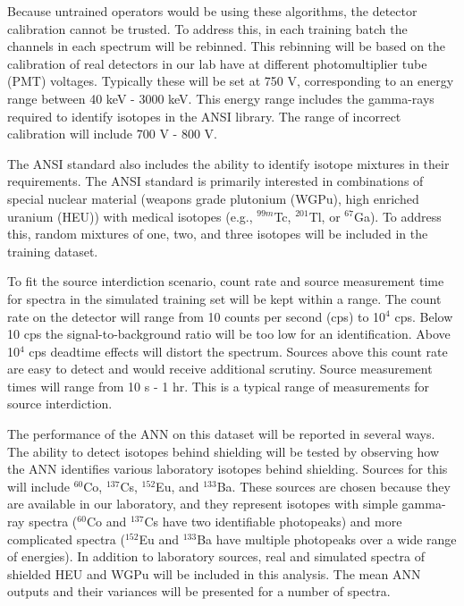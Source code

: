 \documentclass[tocnosub,noragright,centerchapter,12pt,fullpage]{uiucecethesis09}
\begin{document}

Because untrained operators would be using these algorithms, the detector calibration cannot be trusted. To address this, in each training batch the channels in each spectrum will be rebinned. This rebinning will be based on the calibration of real detectors in our lab have at different photomultiplier tube (PMT) voltages. Typically these will be set at 750 V, corresponding to an energy range between 40 keV - 3000 keV. This energy range includes the gamma-rays required to identify isotopes in the ANSI library. The range of incorrect calibration will include 700 V - 800 V.

The ANSI standard also includes the ability to identify isotope mixtures in their requirements. The ANSI standard is primarily interested in combinations of special nuclear material (weapons grade plutonium (WGPu), high enriched uranium (HEU)) with medical isotopes (e.g., $^{99m}$Tc, $^{201}$Tl, or $^{67}$Ga). To address this, random mixtures of one, two, and three isotopes will be included in the training dataset.

To fit the source interdiction scenario, count rate and source measurement time for spectra in the simulated training set will be kept within a range. The count rate on the detector will range from 10 counts per second (cps) to 10$^{4}$ cps. Below 10 cps the signal-to-background ratio will be too low for an identification. Above 10$^{4}$ cps deadtime effects will distort the spectrum. Sources above this count rate are easy to detect and would receive additional scrutiny. Source measurement times will range from 10 s - 1 hr. This is a typical range of measurements for source interdiction. 

The performance of the ANN on this dataset will be reported in several ways. The ability to detect isotopes behind shielding will be tested by observing how the ANN identifies various laboratory isotopes behind shielding. Sources for this will include $^{60}$Co, $^{137}$Cs, $^{152}$Eu, and $^{133}$Ba. These sources are chosen because they are available in our laboratory, and they represent isotopes with simple gamma-ray spectra ($^{60}$Co and $^{137}$Cs have two identifiable photopeaks) and more complicated spectra ($^{152}$Eu and $^{133}$Ba have multiple photopeaks over a wide range of energies). In addition to laboratory sources, real and simulated spectra of shielded HEU and WGPu will be included in this analysis. The mean ANN outputs and their variances will be presented for a number of spectra. 
\end{document}
